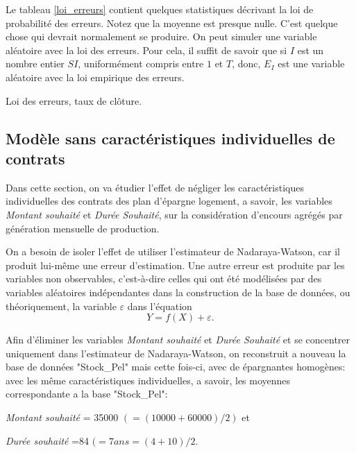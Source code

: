 \documentclass[12pt, a4paper]{book}
\begin{document}
Le tableau \ref{loi_erreurs} contient quelques statistiques décrivant la loi de probabilité des erreurs. Notez que la moyenne est presque nulle. C'est quelque chose qui devrait normalement se produire.
On peut simuler une variable aléatoire avec la loi des erreurs. Pour cela, il suffit de savoir que si $I$ est un nombre entier $SI$, uniformément compris entre $1$ et $T$, donc,  
$E_I$
est une variable aléatoire avec la loi empirique des erreurs.



\begin{table}[h!]
	\caption{Loi des erreurs, taux de clôture.}
	\bigskip	
	\label{loi_erreurs}
	\centering
\end{table}


\subsection{Modèle sans caractéristiques individuelles de contrats}

Dans cette section, on va étudier  l'effet de négliger les caractéristiques individuelles des contrats des plan d'épargne logement, a savoir, les variables {\it Montant souhaité} et {\it Durée Souhaité}, sur la considération d'encours agrégés par génération mensuelle de production.  

On a besoin de isoler l'effet de utiliser l'estimateur de Nadaraya-Watson, car il produit lui-même une erreur d'estimation. Une autre erreur est produite par les variables non observables, c'est-à-dire celles qui ont été modélisées par des variables aléatoires indépendantes dans la construction de la base de données, ou théoriquement, la variable $ \varepsilon$ dans l'équation $$Y = f(X) + \varepsilon.$$

Afin d'éliminer les variables {\it Montant souhaité} et {\it Durée Souhaité} et se concentrer uniquement dans l'estimateur de Nadaraya-Watson, on reconstruit a nouveau la base de données "Stock\_Pel" mais cette fois-ci, avec de épargnantes homogènes: avec les même caractéristiques individuelles, a savoir, les moyennes correspondante a la base  "Stock\_Pel":

\begin{description}
\item {\it Montant souhaité} = 35000 $(=(10000 + 60000)/2)$ et
\item {\it Durée souhaité} =84 $(= 7 ans = (4 + 10)/2.$
\end{description}
\end{document}
